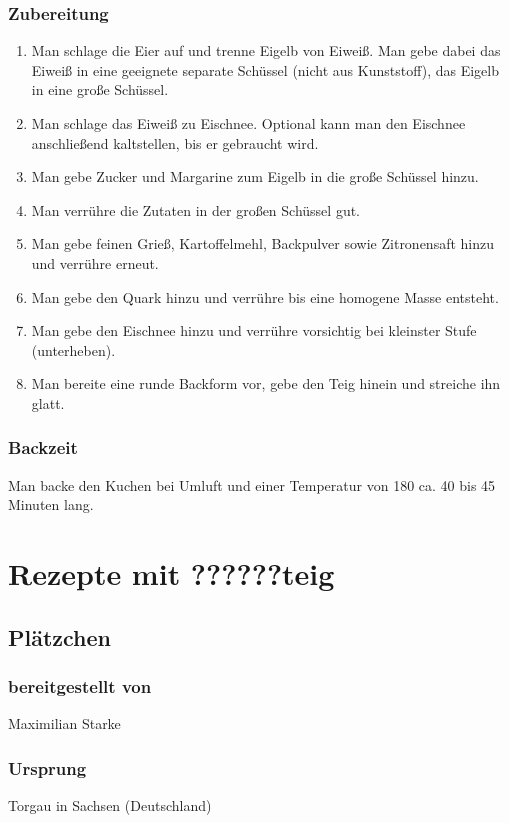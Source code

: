 \documentclass[a4paper]{book}
\begin{document}
\subsubsection{Zubereitung}
\begin{enumerate}[(1)]
	\item Man schlage die Eier auf und trenne Eigelb von Eiweiß. Man gebe dabei das Eiweiß in eine geeignete separate Schüssel (nicht aus Kunststoff), das Eigelb in eine große Schüssel.
	\item Man schlage das Eiweiß zu Eischnee. Optional kann man den Eischnee anschließend kaltstellen, bis er gebraucht wird.
	\item Man gebe Zucker und Margarine zum Eigelb in die große Schüssel hinzu.
	\item Man verrühre die Zutaten in der großen Schüssel gut.
	\item Man gebe feinen Grieß, Kartoffelmehl, Backpulver sowie Zitronensaft hinzu und verrühre erneut.
	\item Man gebe den Quark hinzu und verrühre bis eine homogene Masse entsteht.
	\item Man gebe den Eischnee hinzu und verrühre vorsichtig bei kleinster Stufe (unterheben).
	\item Man bereite eine runde Backform vor, gebe den Teig hinein und streiche ihn glatt.
\end{enumerate}
\subsubsection{Backzeit}
	Man backe den Kuchen bei Umluft und einer Temperatur von 180{\textcelsius} ca. 40 bis 45 Minuten lang.


\section{Rezepte mit ??????teig}

\newpage
\subsection{Plätzchen}
\subsubsection{bereitgestellt von}
	Maximilian Starke
\subsubsection{Ursprung}
	Torgau in Sachsen (Deutschland)
\end{document}
